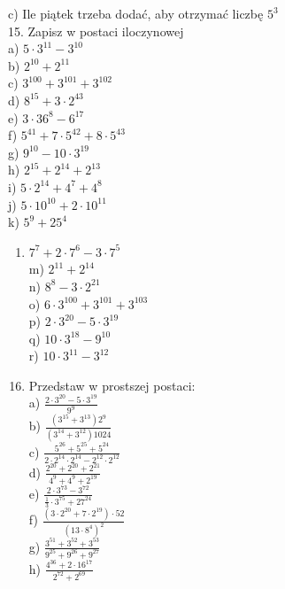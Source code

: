 \documentclass[10pt]{article}
\begin{document}
c) Ile piątek trzeba dodać, aby otrzymać liczbę \(5^{3}\)\\
15. Zapisz w postaci iloczynowej\\
a) \(5 \cdot 3^{11}-3^{10}\)\\
b) \(2^{10}+2^{11}\)\\
c) \(3^{100}+3^{101}+3^{102}\)\\
d) \(8^{15}+3 \cdot 2^{43}\)\\
e) \(3 \cdot 36^{8}-6^{17}\)\\
f) \(5^{41}+7 \cdot 5^{42}+8 \cdot 5^{43}\)\\
g) \(9^{10}-10 \cdot 3^{19}\)\\
h) \(2^{15}+2^{14}+2^{13}\)\\
i) \(5 \cdot 2^{14}+4^{7}+4^{8}\)\\
j) \(5 \cdot 10^{10}+2 \cdot 10^{11}\)\\
k) \(5^{9}+25^{4}\)

\begin{enumerate}
  \item \(7^{7}+2 \cdot 7^{6}-3 \cdot 7^{5}\)\\
m) \(2^{11}+2^{14}\)\\
n) \(8^{8}-3 \cdot 2^{21}\)\\
o) \(6 \cdot 3^{100}+3^{101}+3^{103}\)\\
p) \(2 \cdot 3^{20}-5 \cdot 3^{19}\)\\
q) \(10 \cdot 3^{18}-9^{10}\)\\
r) \(10 \cdot 3^{11}-3^{12}\)
\end{enumerate}

\begin{enumerate}
  \setcounter{enumi}{15}
  \item Przedstaw w prostszej postaci:\\
a) \(\frac{2 \cdot 3^{20}-5 \cdot 3^{19}}{9^{9}}\)\\
b) \(\frac{\left(3^{15}+3^{13}\right) 2^{9}}{\left(3^{14}+3^{12}\right) 1024}\)\\
c) \(\frac{5^{26}+5^{25}+5^{24}}{2 \cdot 2^{14} \cdot 2^{14}-2^{12} \cdot 2^{12}}\)\\
d) \(\frac{2^{20}+2^{20}+2^{21}}{4^{9}+4^{9}+2^{19}}\)\\
e) \(\frac{2 \cdot 3^{73}-3^{72}}{\frac{1}{3} \cdot 3^{75}+27^{24}}\)\\
f) \(\frac{\left(3 \cdot 2^{20}+7 \cdot 2^{19}\right) \cdot 52}{\left(13 \cdot 8^{4}\right)^{2}}\)\\
g) \(\frac{3^{51}+3^{52}+3^{53}}{9^{25}+9^{26}+9^{27}}\)\\
h) \(\frac{4^{36}+2 \cdot 16^{17}}{2^{72}+2^{69}}\)
\end{enumerate}
\end{document}
